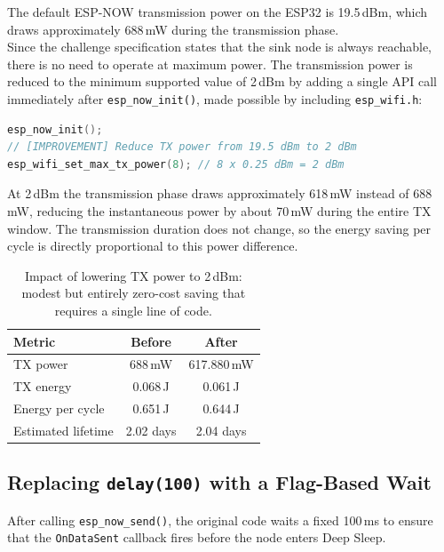 \documentclass[a4paper,11pt]{article}
\begin{document}
The default ESP-NOW transmission power on the ESP32 is 19.5\,dBm, which draws
approximately 688\,mW during the transmission phase.\\

Since the challenge specification states that the sink node is always reachable, there is no need to operate at maximum power. The transmission power is reduced to the minimum supported value of 2\,dBm by adding a single API call immediately after \texttt{esp\_now\_init()}, made possible by including \texttt{esp\_wifi.h}:\\

\begin{lstlisting}[language=C++]
esp_now_init();
// [IMPROVEMENT] Reduce TX power from 19.5 dBm to 2 dBm
esp_wifi_set_max_tx_power(8); // 8 x 0.25 dBm = 2 dBm
\end{lstlisting}

At 2\,dBm the transmission phase draws approximately 618\,mW instead of 688\,mW,
reducing the instantaneous power by about 70\,mW during the entire TX window.
The transmission duration does not change, so the energy saving per cycle is directly
proportional to this power difference.

\begin{table}[H]
\centering
\begin{tabular}{lcc}
\toprule
\textbf{Metric} & \textbf{Before} & \textbf{After} \\
\midrule
TX power           & 688\,mW   & 617.880\,mW \\
TX energy          & 0.068\,J  & 0.061\,J \\
Energy per cycle   & 0.651\,J  & 0.644\,J \\
Estimated lifetime & 2.02 days & 2.04 days \\
\bottomrule
\end{tabular}
\caption{Impact of lowering TX power to 2\,dBm: modest but entirely zero-cost saving
that requires a single line of code.}
\end{table}

\subsection{Replacing \texttt{delay(100)} with a Flag-Based Wait}

After calling \texttt{esp\_now\_send()}, the original code waits a fixed 100\,ms to ensure that the \texttt{OnDataSent} callback fires before the node enters Deep Sleep.\\
\end{document}
